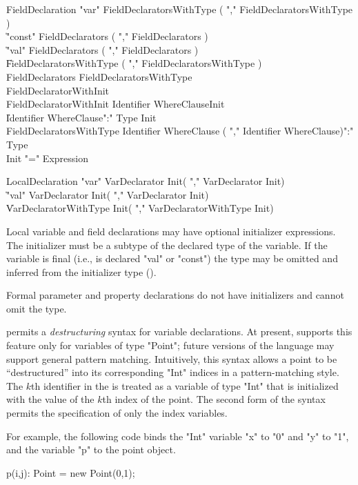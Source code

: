 \begin{grammar}
FieldDeclaration
        \: \xcd"var" FieldDeclaratorsWithType ( \xcd"," FieldDeclaratorsWithType )\star \\
        \| \xcd"const" FieldDeclarators ( \xcd"," FieldDeclarators )\star \\
        \| \xcd"val" FieldDeclarators ( \xcd"," FieldDeclarators )\star \\
        \| FieldDeclaratorsWithType ( \xcd"," FieldDeclaratorsWithType )\star \\
FieldDeclarators
        \: FieldDeclaratorsWithType \\
        \: FieldDeclaratorWithInit \\
FieldDeclaratorWithInit
        \: Identifier WhereClause\opt Init \\
        \| Identifier WhereClause\opt \xcd":" Type Init \\
FieldDeclaratorsWithType
        \: Identifier WhereClause\opt
                ( \xcd"," Identifier WhereClause\opt )\star \xcd":" Type \\
Init \: \xcd"=" Expression \\
\end{grammar}

\begin{grammar}
LocalDeclaration
        \: \xcd"var" VarDeclarator Init\opt ( \xcd"," VarDeclarator Init\opt )\star \\
        \| \xcd"val" VarDeclarator Init\opt ( \xcd"," VarDeclarator Init\opt )\star \\
        \| VarDeclaratorWithType Init\opt ( \xcd"," VarDeclaratorWithType Init\opt )\star \\
\end{grammar}

Local variable and field declarations may have optional
initializer expressions.  The initializer must be a subtype of
the declared type of the variable.  If the variable is final
(i.e., is declared \xcd"val" or \xcd"const")
the type may be omitted and
inferred from the initializer type ().

Formal parameter and property declarations do not have
initializers and cannot omit the type.

\Xten{} permits a \emph{destructuring} syntax for variable
declarations.
At present, \XtenCurrVer{} supports this feature only for
variables of
type \xcd"Point"; future versions of the language may support 
general pattern matching.
Intuitively, this syntax allows a
point to be ``destructured'' into its corresponding \xcd"Int" 
indices in a pattern-matching style.
The $k$th identifier in the 
is treated as a variable of type \xcd"Int"
that is initialized with the value of the $k$th index of the point. 
The second form of the syntax permits the specification of only
the index variables.

For example, the following code binds the \xcd"Int" variable \xcd"x" to
\xcd"0" and \xcd"y" to \xcd"1", and the variable \xcd"p" to the
point object.
\begin{xten}
p(i,j): Point = new Point(0,1);
\end{xten}
